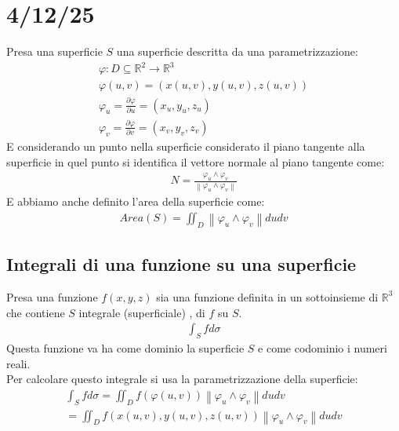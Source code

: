 \documentclass[a4paper, oneside]{article}
\begin{document}
\newpage
\section{4/12/25}
Presa una superficie $S$ una superficie descritta da una parametrizzazione:
\begin{gather*}
  \varphi : D \subseteq \mathbb{R}^2 \to \mathbb{R}^3\\
  \varphi(u,v) = (x(u,v), y(u,v), z(u,v))\\
  \varphi_u = \frac{\partial \varphi}{\partial u} = (x_u, y_u, z_u)\\
  \varphi_v = \frac{\partial \varphi}{\partial v} = (x_v, y_v, z_v)
\end{gather*}
E considerando un punto nella superficie considerato il piano tangente alla superficie in quel punto si identifica il vettore normale al piano tangente come:
\begin{gather*}
  N = \frac{\varphi_u \land \varphi_v}{\left\lVert \varphi_u \land \varphi_v \right\rVert}
\end{gather*}
E abbiamo anche definito l'area della superficie come:
\begin{gather*}
  Area(S) = \iint_D \left\lVert \varphi_u \land \varphi_v \right\rVert dudv
\end{gather*}
\subsection{Integrali di una funzione su una superficie}
Presa una funzione $f(x,y,z)$ sia una funzione definita in un sottoinsieme di $\mathbb{R}^3$ che contiene $S$ integrale (superficiale) , di $f$ su $S$.
\begin{gather*}
  \int_S f d \sigma
\end{gather*}
Questa funzione va ha come dominio la superficie $S$ e come codominio i numeri reali.\\
Per calcolare questo integrale si usa la parametrizzazione della superficie:
\begin{gather*}
  \int_S f d \sigma = \iint_D f(\varphi(u,v)) \left\lVert \varphi_u \land \varphi_v \right\rVert dudv\\
  = \iint_D f(x(u,v), y(u,v), z(u,v)) \left\lVert \varphi_u \land \varphi_v \right\rVert dudv
\end{gather*}
\end{document}
